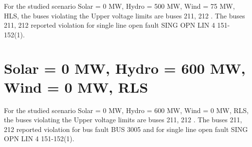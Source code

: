 \documentclass[10pt]{report}
\begin{document}
For the studied scenario Solar = 0 MW, Hydro = 500 MW, Wind = 75 MW, HLS, the buses violating the Upper voltage limits are buses 211, 212 .
The buses 211, 212 reported violation for single line open fault SING OPN LIN   4 151-152(1).
\begin{table}[H]
\caption{Contingencies reporting bus voltages greater than emergency voltage of 1.1 PU for scenario Solar = 0 MW, Hydro = 500 MW, Wind = 75 MW, HLS}
\label{HVSolar0MWHydro500MWWind75MWHLS}
\centering
{}
\end{table}

\section{Solar = 0 MW, Hydro = 600 MW, Wind = 0 MW, RLS}

For the studied scenario Solar = 0 MW, Hydro = 600 MW, Wind = 0 MW, RLS, the buses violating the Upper voltage limits are buses 211, 212 .
The buses 211, 212 reported violation for bus fault BUS 3005 and for single line open fault SING OPN LIN   4 151-152(1).
\begin{table}[H]
\caption{Contingencies reporting bus voltages greater than emergency voltage of 1.1 PU for scenario Solar = 0 MW, Hydro = 600 MW, Wind = 0 MW, RLS}
\label{HVSolar0MWHydro600MWWind0MWRLS}
\centering
{}
\end{table}
\end{document}
